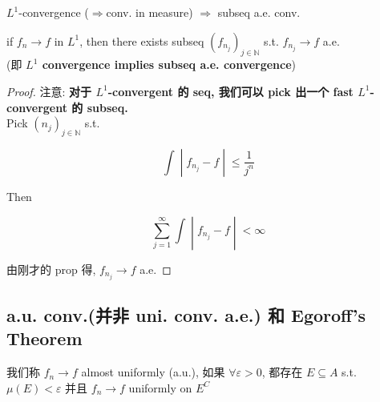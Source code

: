 \documentclass{qlnotes-export}
\begin{document}
\begin{corollary}{\(L^{1}\)-convergence (\(\Longrightarrow\)conv. in measure)
\(\Longrightarrow\) subseq a.e. conv.}\label{cor-05-integration-of-real-and-complex-functions-l-1-convergence-impliesconv-in-measure-implies-subseq-a-e-conv}

if \(f_{n}\rightarrow f\) in \(L^{1}\), then there exists subseq \((f_{n_{j}})_{j \in {\mathbb{N}}}\) s.t. \(f_{n_{j}}\rightarrow f\) a.e.\\
(即 \textbf{\(L^{1}\) convergence implies subseq a.e. convergence})

\end{corollary}

\begin{proof}

注意: \textbf{对于 \(L^{1}\)-convergent 的 seq, 我们可以 pick 出一个 fast \(L^{1}\)-convergent 的 subseq.}\\
Pick \((n_{j})_{j \in {\mathbb{N}}}\) s.t.

\[\left. \int \middle| f_{n_{j}} - f \middle| \leq \frac{1}{j^{n}} \right.\]

Then

\[\left. \sum\limits_{j = 1}^{\infty}\int \middle| f_{n_{j}} - f \middle| < \infty \right.\]

由刚才的 prop 得, \(f_{n_{j}}\rightarrow f\) a.e.

\end{proof}

\subsection{a.u. conv.(并非 uni. conv. a.e.) 和 Egoroff's Theorem}\label{a.u.-conv.ux5e76ux975e-uni.-conv.-a.e.-ux548c-egoroffs-theorem}

\begin{definition}\label{def-05-integration-of-real-and-complex-functions-definition-009}

我们称 \(f_{n}\rightarrow f\) almost uniformly (a.u.), 如果 \(\forall\varepsilon > 0\), 都存在 \(E \subseteq A\) s.t. \(\mu(E) < \varepsilon\) 并且 \(f_{n}\rightarrow f\) uniformly on \(E^{C}\)

\end{definition}
\end{document}
